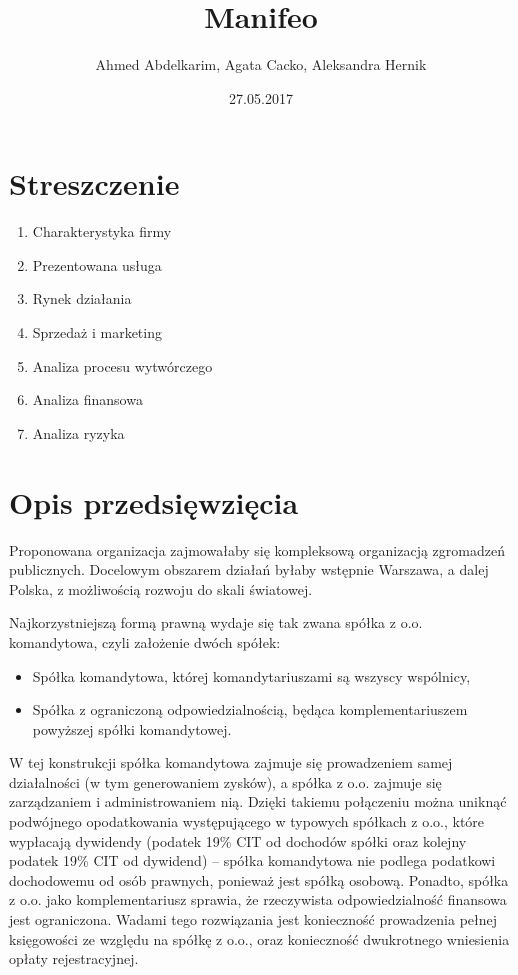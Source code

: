 \documentclass{article}
\title{\Huge{Manifeo}\\ %
}
\author{\large{Ahmed Abdelkarim, Agata Cacko, Aleksandra Hernik}}
\date{\large{27.05.2017}}
\begin{document}
\maketitle
\vspace{2cm}
\tableofcontents
\newpage




\section{Streszczenie}
\begin{enumerate}
\item Charakterystyka firmy
\item Prezentowana usługa %
\item Rynek działania
\item Sprzedaż i marketing
\item Analiza procesu wytwórczego %
\item Analiza finansowa
\item Analiza ryzyka
\end{enumerate}

\section{Opis przedsięwzięcia}
Proponowana organizacja zajmowałaby się kompleksową organizacją zgromadzeń publicznych. Docelowym obszarem działań byłaby wstępnie Warszawa, a dalej Polska, z możliwością rozwoju do skali światowej.   

Najkorzystniejszą formą prawną wydaje się tak zwana spółka z o.o. komandytowa, czyli założenie dwóch spółek:
\begin{itemize}
\item Spółka komandytowa, której komandytariuszami są wszyscy wspólnicy,
\item Spółka z ograniczoną odpowiedzialnością, będąca komplementariuszem powyższej spółki komandytowej.
\end{itemize}
W tej konstrukcji spółka komandytowa zajmuje się prowadzeniem samej działalności (w tym generowaniem zysków), a spółka z o.o. zajmuje się zarządzaniem i administrowaniem nią. Dzięki takiemu połączeniu można uniknąć podwójnego opodatkowania występującego w typowych spółkach z o.o., które wypłacają dywidendy (podatek 19\% CIT od dochodów spółki oraz kolejny podatek 19\% CIT od dywidend) -- spółka komandytowa nie podlega podatkowi dochodowemu od osób prawnych, ponieważ jest spółką osobową. Ponadto, spółka z o.o. jako komplementariusz sprawia, że rzeczywista odpowiedzialność finansowa jest ograniczona. Wadami tego rozwiązania jest konieczność prowadzenia pełnej księgowości ze względu na spółkę z o.o., oraz konieczność dwukrotnego wniesienia opłaty rejestracyjnej.
\end{document}
